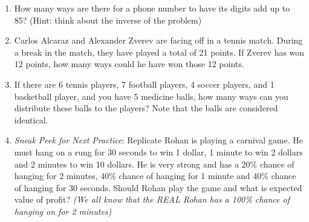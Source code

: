 \documentclass[inline]{article}
\begin{document}
\begin{enumerate}[itemsep=2.85cm]
    \item How many ways are there for a phone number to have its digits add up to 85? (Hint: think about the inverse of the problem)
    \item Carlos Alcaraz and Alexander Zverev are facing off in a tennis match. During a break in the match, they have played a total of 21 points. If Zverev has won 12 points, how many ways could he have won those 12 points.
    \item If there are 6 tennis players, 7 football players, 4 soccer players, and 1 basketball player, and you have 5 medicine balls, how many ways can you distribute these balls to the players? Note that the balls are considered identical.
    
    \item \textit{Sneak Peek for Next Practice}: Replicate Rohan is playing a carnival game. He must hang on a rung for 30 seconds to win 1 dollar, 1 minute to win 2 dollars and 2 minutes to win 10 dollars. He is very strong and has a 20\% chance of hanging for 2 minutes, 40\% chance of hanging for 1 minute and 40\% chance of hanging for 30 seconds. Should Rohan play the game and what is expected value of profit? \textit{(We all know that the REAL Rohan has a 100\% chance of hanging on for 2 minutes)}
    
\end{enumerate}
\end{document}
